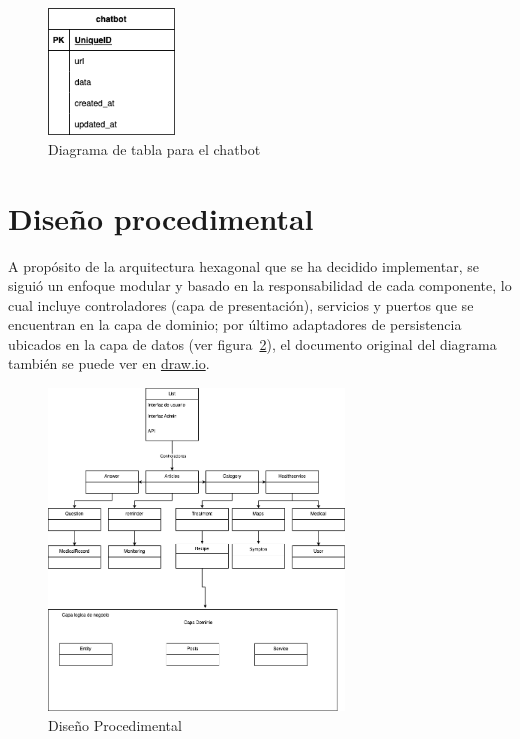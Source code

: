 \begin{figure}[h]
    \centering
    \includegraphics[width=0.3\textwidth]{img/datos/chatbot_emur.drawio.png}
    \caption{Diagrama de tabla para el chatbot} \label{Img:Diseno+de+Datos+Chatbot}
\end{figure} 

\newpage
\section{Diseño procedimental}
A propósito de la arquitectura hexagonal que se ha decidido implementar, se siguió un enfoque modular y basado en la  responsabilidad de cada componente, lo cual incluye controladores (capa de presentación), servicios y puertos que se encuentran en la capa de dominio; por último adaptadores de persistencia ubicados en la capa de datos (ver figura~\ref{Img:Diseno+Procedimental}), el documento original del diagrama también se puede ver en \href{https://drive.google.com/file/d/1Dp13RXxUGILHrhwLvSDbNNQ2T72sM4j7/view?usp=sharing}{draw.io}.

\begin{figure}[h]
    \centering
    \includegraphics[width=0.7\textwidth]{img/manual/procidemental_drawio.png}
    \caption{Diseño Procedimental} \label{Img:Diseno+Procedimental}
\end{figure} 


